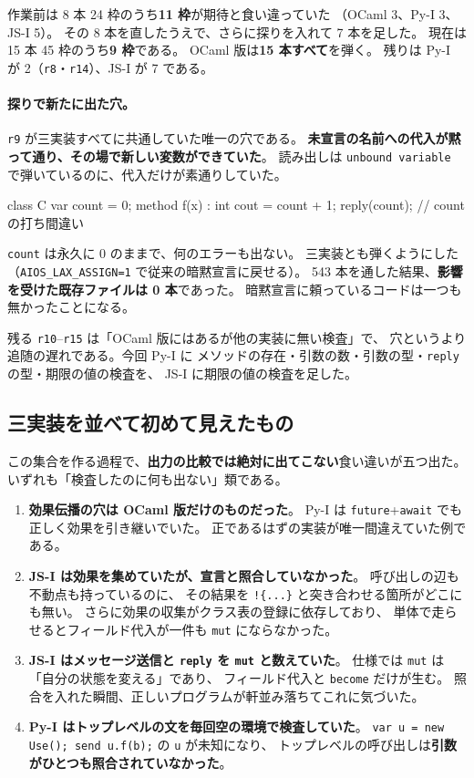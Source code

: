 \documentclass[11pt,a4paper]{ltjsarticle}
\theoremstyle{definition}
\theoremstyle{remark}
\begin{document}
作業前は 8 本 24 枠のうち\textbf{11 枠}が期待と食い違っていた
（OCaml 3、Py-I 3、JS-I 5）。
その 8 本を直したうえで、さらに探りを入れて 7 本を足した。
現在は 15 本 45 枠のうち\textbf{9 枠}である。
OCaml 版は\textbf{15 本すべて}を弾く。
残りは Py-I が 2（\texttt{r8}・\texttt{r14}）、JS-I が 7 である。

\paragraph{探りで新たに出た穴。}
\texttt{r9} が三実装すべてに共通していた唯一の穴である。
\textbf{未宣言の名前への代入が黙って通り、その場で新しい変数ができていた}。
読み出しは \texttt{unbound variable} で弾いているのに、代入だけが素通りしていた。

\begin{aipl}
class C {
  var count = 0;
  method f(x) : int { cout = count + 1; reply(count); }   // count の打ち間違い
}
\end{aipl}

\texttt{count} は永久に 0 のままで、何のエラーも出ない。
三実装とも弾くようにした（\texttt{AIOS\_LAX\_ASSIGN=1} で従来の暗黙宣言に戻せる）。
543 本を通した結果、\textbf{影響を受けた既存ファイルは 0 本}であった。
暗黙宣言に頼っているコードは一つも無かったことになる。

残る \texttt{r10}--\texttt{r15} は「OCaml 版にはあるが他の実装に無い検査」で、
穴というより追随の遅れである。今回 Py-I に
メソッドの存在・引数の数・引数の型・\texttt{reply} の型・期限の値の検査を、
JS-I に期限の値の検査を足した。

\subsection{三実装を並べて初めて見えたもの}

この集合を作る過程で、\textbf{出力の比較では絶対に出てこない}食い違いが五つ出た。
いずれも「検査したのに何も出ない」類である。

\begin{enumerate}
\item \textbf{効果伝播の穴は OCaml 版だけのものだった}。
      Py-I は \texttt{future}+\texttt{await} でも正しく効果を引き継いでいた。
      正であるはずの実装が唯一間違えていた例である。
\item \textbf{JS-I は効果を集めていたが、宣言と照合していなかった}。
      呼び出しの辺も不動点も持っているのに、
      その結果を \texttt{!\{...\}} と突き合わせる箇所がどこにも無い。
      さらに効果の収集がクラス表の登録に依存しており、
      単体で走らせるとフィールド代入が一件も \texttt{mut} にならなかった。
\item \textbf{JS-I はメッセージ送信と \texttt{reply} を \texttt{mut} と数えていた}。
      仕様では \texttt{mut} は「自分の状態を変える」であり、
      フィールド代入と \texttt{become} だけが生む。
      照合を入れた瞬間、正しいプログラムが軒並み落ちてこれに気づいた。
\item \textbf{Py-I はトップレベルの文を毎回空の環境で検査していた}。
      \texttt{var u = new Use(); send u.f(b);} の \texttt{u} が未知になり、
      トップレベルの呼び出しは\textbf{引数がひとつも照合されていなかった}。
\end{enumerate}
\end{document}
